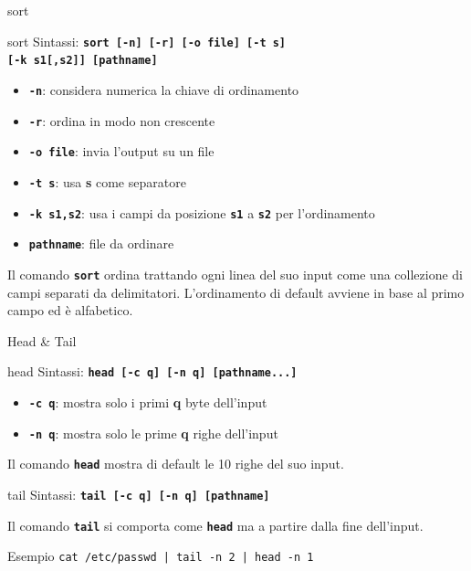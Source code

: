 \documentclass{beamer}
\begin{document}
    \begin{frame}{sort}
        \begin{block}{sort}
            \small
            Sintassi: \texttt{\textbf{sort [-n] [-r] [-o file] [-t s]}} \\
            \texttt{\textbf{[-k s1[,s2]] [pathname]}}

            \begin{itemize}
                \item \texttt{\textbf{-n}}: considera numerica la chiave di ordinamento
                \item \texttt{\textbf{-r}}: ordina in modo non crescente
                \item \texttt{\textbf{-o file}}: invia l'output su un file
                \item \texttt{\textbf{-t s}}: usa \textbf{s} come separatore
                \item \texttt{\textbf{-k s1,s2}}: usa i campi da posizione \texttt{\textbf{s1}} a \texttt{\textbf{s2}} per l'ordinamento
                \item \texttt{\textbf{pathname}}: file da ordinare
            \end{itemize}

            Il comando \texttt{\textbf{sort}} ordina trattando ogni linea del suo input come una
            collezione di campi separati da delimitatori.
            L’ordinamento di default avviene in base al primo campo ed è alfabetico.
        \end{block}
    \end{frame}

    \begin{frame}{Head \& Tail}
        \begin{block}{head}
            \small
            Sintassi: \texttt{\textbf{head [-c q] [-n q] [pathname...]}}

            \begin{itemize}
                \item \texttt{\textbf{-c q}}: mostra solo i primi \textbf{q} byte dell'input
                \item \texttt{\textbf{-n q}}: mostra solo le prime \textbf{q} righe dell'input
            \end{itemize}

            Il comando \texttt{\textbf{head}} mostra di default le 10 righe del suo input.
        \end{block}

        \begin{block}{tail}
            \small
            Sintassi: \texttt{\textbf{tail [-c q] [-n q] [pathname]}}

            Il comando \texttt{\textbf{tail}} si comporta come \texttt{\textbf{head}} ma
            a partire dalla fine dell'input.
        \end{block}

        \begin{exampleblock}{Esempio}
            \small
            \texttt{cat /etc/passwd | tail -n 2 | head -n 1}
        \end{exampleblock}
    \end{frame}
\end{document}
